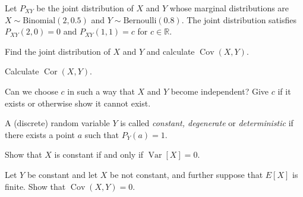 \documentclass[a4paper,10pt,landscape,twocolumn]{scrartcl}
\DeclareMathOperator{\Cov}{Cov}
\DeclareMathOperator{\Cor}{Cor}
\DeclareMathOperator{\Var}{Var}
\begin{document}
\begin{exercise}[3pt]
  Let $P_{XY}$ be the joint distribution of $X$ and $Y$ whose marginal
  distributions are $X \sim \text{Binomial}(2, 0.5)$ and 
  $Y \sim \text{Bernoulli}(0.8)$. The joint distribution satisfies 
  $P_{XY}(2,0) = 0$ and $P_{XY}(1,1) = c$ for $c\in \mathbb R$.

  \begin{subex}[1pt]
    Find the joint distribution of $X$ and $Y$ and calculate $\Cov(X,Y)$.
  \end{subex}
  
  \begin{subex}[1pt]
  Calculate $\Cor(X,Y)$.	
  \end{subex}
  
  \begin{subex}[1pt]
    Can we choose $c$ in such a way that $X$ and $Y$ become independent? Give
    $c$ if it exists or otherwise show it cannot exist.
  \end{subex}
\end{exercise}


\begin{exercise}
  A (discrete) random variable $Y$ is called \emph{constant, degenerate} or
  \emph{deterministic} if there exists a point $a$ such that $P_Y(a) = 1$.

  \begin{subex}[1pt]
    Show that $X$ is constant if and only if $\Var[X] = 0$.	
  \end{subex}
  
  \begin{subex}[1pt]
    Let $Y$ be constant and let $X$ be not constant, and further suppose that
    $E[X]$ is finite. Show that $\Cov(X,Y) = 0$.
  \end{subex}
\end{exercise}
\end{document}
